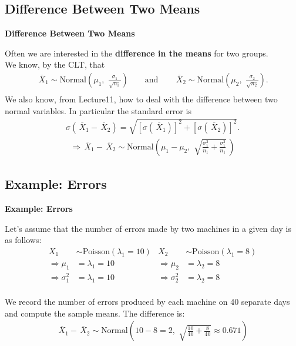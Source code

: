 \documentclass[compress]{beamer}        %
\makeatletter
\newcommand{\tcb}{\textcolor{beamer@blendedblue}}
\makeatother
\begin{document}
\subsection{Difference Between Two Means}
\begin{frame}{\bf \tcb{Difference Between Two Means}}

Often we are interested in the {\bf difference in the means} for two groups.\\[0.2cm]

We know, by the CLT, that
\begin{align*}
\,\overline{\!X}_1 \sim \text{Normal}\left(\mu_1,\,\, \frac{\sigma_1}{\sqrt{n_1}}\right) \qquad\text{and}\qquad \,\overline{\!X}_2 \sim \text{Normal}\left(\mu_2,\,\, \frac{\sigma_2}{\sqrt{n_2}}\right).\\[-0.3cm]
\end{align*}
We also know, from Lecture11, how to deal with the difference between two normal variables. In particular the standard error is
\begin{align*}
\sigma(\,\overline{\!X}_1 - \,\overline{\!X}_2) = \sqrt{[\sigma(\,\overline{\!X}_1)]^2+[\sigma(\,\overline{\!X}_2)]^2}.
\end{align*}
\begin{align*}
\Rightarrow \boxed{\,\overline{\!X}_1 - \,\overline{\!X}_2 \sim \text{Normal}\left(\mu_1-\mu_2,\,\, \sqrt{\frac{\sigma_1^2}{n_1}+\frac{\sigma_1^2}{n_1}}\,\right)}
\end{align*}

\end{frame}



\subsection{Example: Errors}
\begin{frame}{\bf \tcb{Example: Errors}}

Let's assume that the number of errors made by two machines in a given day is as follows:
\begin{align*}
X_1 &\sim \text{Poisson}(\lambda_1=10) & X_2 &\sim \text{Poisson}(\lambda_1=8) \\[0.2cm]
\Rightarrow \mu_1 &= \lambda_1 = 10 & \Rightarrow \mu_2 &= \lambda_2 = 8 \\[0.2cm]
\Rightarrow \sigma_1^2 &= \lambda_1 = 10 & \Rightarrow \sigma_2^2 &= \lambda_2 =8\\
\end{align*}

We record the number of errors produced by each machine on 40 separate days and compute the sample means. The difference is:
\begin{align*}
\,\overline{\!X}_1 - \,\overline{\!X}_2 \sim \text{Normal}\left(10-8=2,\,\, \sqrt{\frac{10}{40}+\frac{8}{40}} \approx 0.671\right)
\end{align*}

\end{frame}
\end{document}
